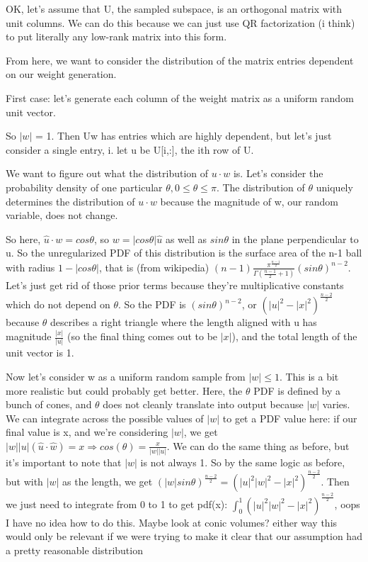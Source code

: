 \documentclass[12pt]{article}
\begin{document}
OK, let's assume that U, the sampled subspace, is an orthogonal matrix with unit columns. We can do this because we can just use QR factorization (i think) to put literally any low-rank matrix into this form.

From here, we want to consider the distribution of the matrix entries dependent on our weight generation.

First case: let's generate each column of the weight matrix as a uniform random unit vector.

So $|w|$ = 1. 
Then Uw has entries which are highly dependent, but let's just consider a single entry, i.
let u be U[i,:], the ith row of U.

We want to figure out what the distribution of $u \cdot w$ is. Let's consider the probability density of one particular $\theta, 0 \leq \theta \leq \pi$. The distribution of $\theta$ uniquely determines the distribution of $u \cdot w$ because the magnitude of w, our random variable, does not change. 

So here, $\hat{u} \cdot w = cos{\theta}$, so $w = |cos{\theta}|\hat{u}$ as well as $sin{\theta}$ in the plane perpendicular to u. So the unregularized PDF of this distribution is the surface area of the n-1 ball with radius $1 - |cos{\theta}|$, that is (from wikipedia) $(n-1)\frac{\pi^\frac{n-1}{2}}{\Gamma(\frac{n-1}{2} + 1)}(sin{\theta})^{n-2}$. Let's just get rid of those prior terms because they're multiplicative constants which do not depend on $\theta$. So the PDF is $(sin{\theta})^{n - 2}$, or $(|u|^2 - |x|^2)^{\frac{n-2}{2}}$ because $\theta$ describes a right triangle where the length aligned with u has magnitude $\frac{|x|}{|u|}$ (so the final thing comes out to be $|x|$), and the total length of the unit vector is 1. 

Now let's consider w as a uniform random sample from $|w| \leq 1$. This is a bit more realistic but could probably get better. Here, the $\theta$ PDF is defined by a bunch of cones, and $\theta$ does not cleanly translate into output because $|w|$ varies. We can integrate across the possible values of $|w|$ to get a PDF value here: if our final value is x, and we're considering $|w|$, we get $|w||u|(\hat{u} \cdot \hat{w}) = x \Rightarrow cos(\theta) = \frac{x}{|w||u|}$. We can do the same thing as before, but it's important to note that $|w|$ is not always 1. So by the same logic as before, but with $|w|$ as the length, we get $(|w|sin{\theta})^{\frac{n-2}{2}} = (|u|^2|w|^2 - |x|^2)^{\frac{n-2}{2}}$. Then we just need to integrate from 0 to 1 to get pdf(x): $\int_{0}^1 (|u|^2|w|^2 - |x|^2)^{\frac{n-2}{2}}$, oops I have no idea how to do this. Maybe look at conic volumes?
either way this would only be relevant if we were trying to make it clear that our assumption had a pretty reasonable distribution
\end{document}
